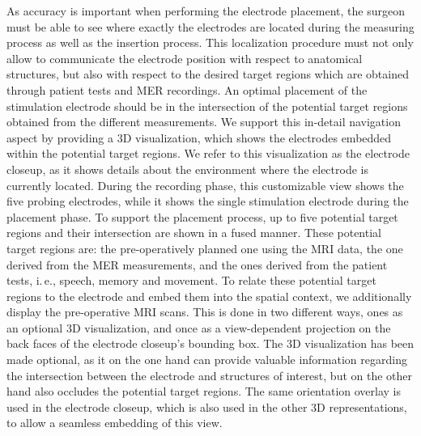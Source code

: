 \documentclass{vgtc}                          %
\begin{document}
As accuracy is important when performing the electrode placement, the surgeon must be able to see where exactly the electrodes are located during the measuring process as well as the insertion process. This localization procedure must not only allow to communicate the electrode position with respect to anatomical structures, but also with respect to the desired target regions which are obtained through patient tests and MER recordings. An optimal placement of the stimulation electrode should be in the intersection of the potential target regions obtained from the different measurements. We support this in-detail navigation aspect by providing a 3D visualization, which shows the electrodes embedded within the potential target regions. We refer to this visualization as the electrode closeup, as it shows details about the environment where the electrode is currently located. During the recording phase, this customizable view shows the five probing electrodes, while it shows the single stimulation electrode during the placement phase. To support the placement process, up to five potential target regions and their intersection are shown in a fused manner. These potential target regions are: the pre-operatively planned one using the MRI data, the one derived from the MER measurements, and the ones derived from the patient tests, i.\,e., speech, memory and movement. To relate these potential target regions to the electrode and embed them into the spatial context, we additionally display the pre-operative MRI scans. This is done in two different ways, ones as an optional 3D visualization, and once as a view-dependent projection on the back faces of the electrode closeup's bounding box. The 3D visualization has been made optional, as it on the one hand can provide valuable information regarding the intersection between the electrode and structures of interest, but on the other hand also occludes the potential target regions. The same orientation overlay is used in the electrode closeup, which is also used in the other 3D representations, to allow a seamless embedding of this view.
\end{document}
